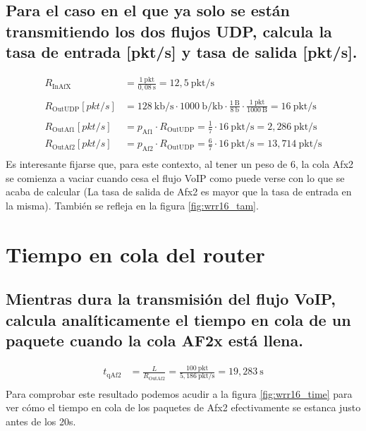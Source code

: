 \subsection{Para el caso en el que ya solo se están transmitiendo los dos flujos UDP, calcula la tasa de entrada [pkt/s] y
tasa de salida [pkt/s].}
\[
    \begin{aligned}
        R_{\text{InAfX}} &= \frac{1~\text{pkt}}{0,08~\text{s}} = 12,5~\text{pkt/s} \\ \\
        R_{\text{OutUDP}}[pkt/s] &= 128~\text{kb/s} \cdot 1000~\text{b/kb} \cdot \frac{1~\text{B}}{8~\text{b}} \cdot \frac{1~\text{pkt}}{1000~\text{B}} = 16~\text{pkt/s} \\ \\
        R_{\text{OutAf1}}[pkt/s] &= p_{\text{Af1}} \cdot R_{\text{OutUDP}} = \frac{1}{7} \cdot 16~\text{pkt/s} = 2,286~\text{pkt/s} \\
        R_{\text{OutAf2}}[pkt/s] &= p_{\text{Af2}} \cdot R_{\text{OutUDP}} = \frac{6}{7} \cdot 16~\text{pkt/s} = 13,714~\text{pkt/s} \\
    \end{aligned}
\]
Es interesante fijarse que, para este contexto, al tener un peso de 6, la cola Afx2 se comienza a vaciar 
cuando cesa el flujo VoIP como puede verse con lo que se acaba de calcular (La tasa de salida de Afx2 es mayor 
que la tasa de entrada en la misma). También se refleja en la figura \ref{fig:wrr16_tam}.

\vspace{1cm}

\section{Tiempo en cola del router}
\subsection{Mientras dura la transmisión del flujo VoIP, calcula analíticamente el tiempo en cola de un paquete cuando
la cola AF2x está llena.}
\[
    \begin{aligned}
        t_{\text{qAf2}} &= \frac{L}{R_{\text{OutAf2}}} = \frac{100~\text{pkt}}{5,186~\text{pkt/s}}= 19,283~\text{s} \\
    \end{aligned}
\]
Para comprobar este resultado podemos acudir a la figura \ref{fig:wrr16_time} para ver cómo el tiempo 
en cola de los paquetes de Afx2 efectivamente se estanca justo antes de los 20s.

